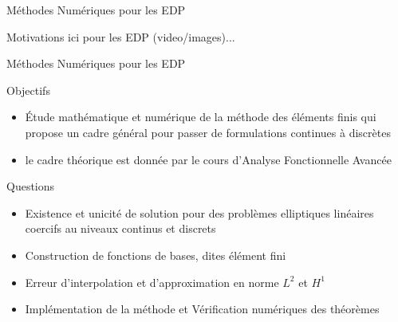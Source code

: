 \documentclass{beamer}
\begin{document}
\begin{frame}{Méthodes Numériques pour les EDP}

Motivations ici pour les EDP (video/images)...

\end{frame}
\begin{frame}{Méthodes Numériques pour les EDP}
  \begin{block}{Objectifs}
    \begin{itemize}
    \item Étude mathématique et numérique de la méthode des éléments
      finis qui propose un cadre général pour passer de formulations
      continues à discrètes
    \item le cadre théorique est donnée par le cours d'Analyse
      Fonctionnelle Avancée
    \end{itemize}
  \end{block}
  \begin{block}{Questions}
    \begin{itemize}
    \item Existence et unicité de solution pour des problèmes
      elliptiques linéaires coercifs au niveaux continus et discrets
    \item Construction de fonctions de bases, dites élément fini
    \item Erreur d'interpolation et d'approximation en norme $L^2$ et $H^1$
    \item Implémentation de la méthode et Vérification numériques des théorèmes
    \end{itemize}
  \end{block}
\end{frame}
\end{document}
